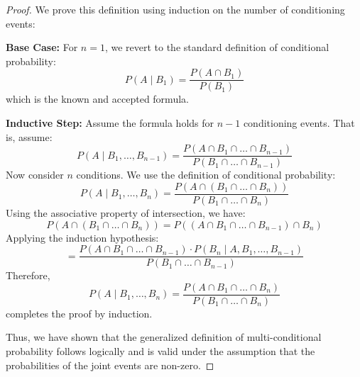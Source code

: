 \begin{proof}
	We prove this definition using induction on the number of conditioning events:
	
	\textbf{Base Case:} 
	For \( n = 1 \), we revert to the standard definition of conditional probability:
	\[
	P(A \mid B_1) = \frac{P(A \cap B_1)}{P(B_1)}
	\]
	which is the known and accepted formula.
	
	\textbf{Inductive Step:}
	Assume the formula holds for \( n-1 \) conditioning events. That is, assume:
	\[
	P(A \mid B_1, \ldots, B_{n-1}) = \frac{P(A \cap B_1 \cap \ldots \cap B_{n-1})}{P(B_1 \cap \ldots \cap B_{n-1})}
	\]
	Now consider \( n \) conditions. We use the definition of conditional probability:
	\[
	P(A \mid B_1, \ldots, B_n) = \frac{P(A \cap (B_1 \cap \ldots \cap B_n))}{P(B_1 \cap \ldots \cap B_n)}
	\]
	Using the associative property of intersection, we have:
	\[
	P(A \cap (B_1 \cap \ldots \cap B_n)) = P((A \cap B_1 \cap \ldots \cap B_{n-1}) \cap B_n)
	\]
	Applying the induction hypothesis:
	\[
	= \frac{P(A \cap B_1 \cap \ldots \cap B_{n-1}) \cdot P(B_n \mid A, B_1, \ldots, B_{n-1})}{P(B_1 \cap \ldots \cap B_{n-1})}
	\]
	Therefore,
	\[
	P(A \mid B_1, \ldots, B_n) = \frac{P(A \cap B_1 \cap \ldots \cap B_n)}{P(B_1 \cap \ldots \cap B_n)}
	\]
	completes the proof by induction.
	
	Thus, we have shown that the generalized definition of multi-conditional probability follows logically and is valid under the assumption that the probabilities of the joint events are non-zero.
\end{proof}
